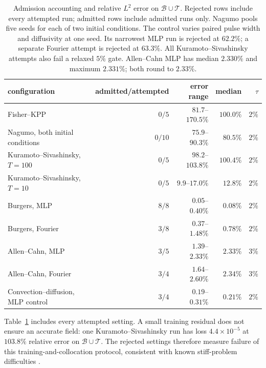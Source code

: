 \begin{table}[t]
\centering\small

\begin{tabular}{@{}lrrrr@{}}
\toprule
configuration & admitted/attempted & error range & median & $\tau$\\
\midrule
Fisher--KPP & $0/5$ & $81.7$--$170.5\%$ & $100.0\%$ & $2\%$\\
Nagumo, both initial conditions & $0/10$ & $75.9$--$90.3\%$ & $80.5\%$ & $2\%$\\
Kuramoto--Sivashinsky, $T=100$ & $0/5$ & $98.2$--$103.8\%$ & $100.4\%$ & $2\%$\\
Kuramoto--Sivashinsky, $T=10$ & $0/5$ & $9.9$--$17.0\%$ & $12.8\%$ & $2\%$\\
\midrule
Burgers, MLP & $8/8$ & $0.05$--$0.40\%$ & $0.08\%$ & $2\%$\\
Burgers, Fourier & $3/8$ & $0.37$--$1.48\%$ & $0.78\%$ & $2\%$\\
Allen--Cahn, MLP & $3/5$ & $1.39$--$2.33\%$ & $2.33\%$ & $3\%$\\
Allen--Cahn, Fourier & $3/4$ & $1.64$--$2.60\%$ & $2.34\%$ & $3\%$\\
Convection--diffusion, MLP control & $3/4$ & $0.19$--$0.31\%$ & $0.21\%$ & $2\%$\\
\bottomrule
\end{tabular}
\caption{Admission accounting and relative $L^2$ error on $\mathcal B\cup\mathcal T$.
Rejected rows include every attempted run; admitted rows include admitted runs only.
Nagumo pools five seeds for each of two initial conditions. The control varies paired
pulse width and diffusivity at one seed. Its narrowest MLP run is rejected at
$62.2\%$; a separate Fourier attempt is rejected at $63.3\%$. All Kuramoto--Sivashinsky
attempts also fail a relaxed $5\%$ gate. Allen--Cahn MLP has median $2.330\%$
and maximum $2.331\%$; both round to $2.33\%$.}
\label{tab:rejected}
\end{table}

Table~\ref{tab:rejected} includes every attempted setting. A small training residual
does not ensure an accurate field: one Kuramoto--Sivashinsky run has loss
$4.4\times10^{-5}$ at $103.8\%$ relative error on $\mathcal B\cup\mathcal T$. The rejected settings therefore
measure failure of this training-and-collocation protocol, consistent with known
stiff-problem difficulties \citep{krishnapriyan2021failure,wang2022ntk}.

